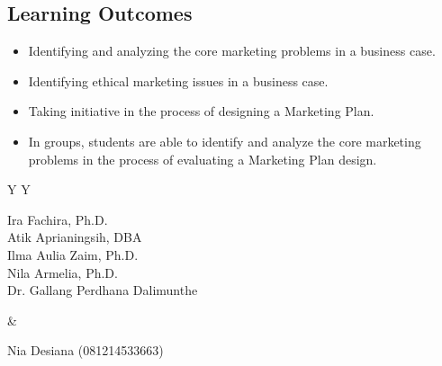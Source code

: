 \documentclass[10pt]{article}
\begin{document}
\subsection{Learning Outcomes}
\begin{itemize}
\item Identifying and analyzing the core marketing problems in a business case.
\item Identifying ethical marketing issues in a business case.
\item Taking initiative in the process of designing a Marketing Plan.
\item In groups, students are able to identify and analyze the core marketing problems in the process of evaluating a Marketing Plan design.
\end{itemize}

\begin{tabularx}{\textwidth}{Y Y}
\begin{tcolorbox}[colback=white,colframe=navy,title=Tim Pengajar - Dosen Pengampu,fonttitle=\bfseries]
Ira Fachira, Ph.D.\\Atik Aprianingsih, DBA\\Ilma Aulia Zaim, Ph.D.\\Nila Armelia, Ph.D.\\Dr. Gallang Perdhana Dalimunthe
\end{tcolorbox}&
\begin{tcolorbox}[colback=white,colframe=midblue,title=Asisten Mata Kuliah,fonttitle=\bfseries]
Nia Desiana (081214533663)
\end{tcolorbox}
\end{tabularx}
\end{document}
